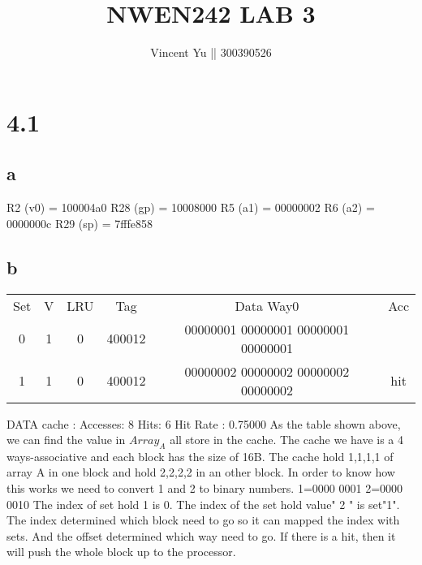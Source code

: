 \documentclass[]{article}
\title{NWEN242 LAB 3}
\author{Vincent Yu || 300390526}
\begin{document}
\maketitle
\section{4.1}
\subsection*{a}
R2  (v0) = 100004a0 \newline
R28 (gp) = 10008000\newline
R5  (a1) = 00000002 \newline
R6  (a2) = 0000000c\newline
R29 (sp) = 7fffe858\newline
\subsection*{b}
\begin{center}
	\begin{tabular}{c c c c c c}
		Set & V & LRU & Tag & Data Way0 & Acc \\
		0  & 1 & 0  & 400012 & 00000001 00000001  00000001 00000001& \\
		1  & 1 & 0  & 400012 & 00000002 00000002  00000002 00000002& hit\\  		
	\end{tabular}
\end{center}
DATA cache : Accesses: 8  Hits: 6 Hit Rate : 0.75000 \newline 
As the table shown above, we can find the value in $Array_A$ all store in the cache.\newline 
The cache we have is a 4 ways-associative and each block has the size of 16B. \newline
The cache hold 1,1,1,1 of array A in one block and hold 2,2,2,2 in an other block. In order to know how this works we need to convert 1 and 2 to binary numbers. 1=0000 0001 2=0000 0010 The index of set hold 1 is 0. The index of the set hold value" 2 " is set"1". \newline 
The index determined which block need to go so it can mapped the index with sets. And the offset determined which way need to go. If there is a hit, then it will push the whole block up to the processor.\newline
\end{document}
